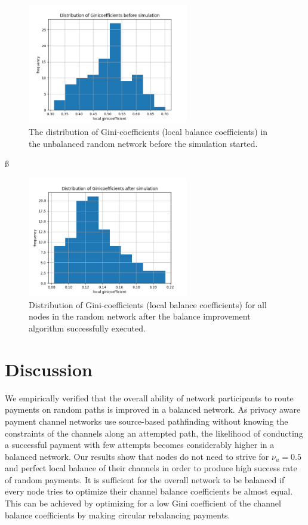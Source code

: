 \documentclass[a4paper]{paper}
\begin{document}
\begin{figure}
 \centering
 \includegraphics[width=7cm]{code/results/routabilityTest/1574847007_ginicoefficients_start.png}
 \caption{The distribution of Gini-coefficients (local balance coefficients) in the unbalanced random network before the simulation started.}
 \label{fig:giniStart}
\end{figure}ß
\begin{figure}
 \centering
 \includegraphics[width=7cm]{code/results/routabilityTest/1574847007_ginicoefficients_end.png}
 \caption{Distribution of Gini-coefficients (local balance coefficients) for all nodes in the random network after the balance improvement algorithm successfully executed.}
 \label{fig:giniEnd}
\end{figure}






\section{Discussion}
\label{sec:conclusion}
We empirically verified that the overall ability of network participants to route payments on random paths is improved in a balanced network. 
As privacy aware payment channel networks use source-based pathfinding without knowing the constraints of the channels along an attempted path, the likelihood of conducting a successful payment with few attempts becomes considerably higher in a balanced network.
Our results show that nodes do not need to strive for $\nu_u = 0.5$ and perfect local balance of their channels in order to produce high success rate of random payments.
It is sufficient for the overall network to be balanced if every node tries to optimize their channel balance coefficients be almost equal. 
This can be achieved by optimizing for a low Gini coefficient of the channel balance coefficients by making circular rebalancing payments.
\end{document}
